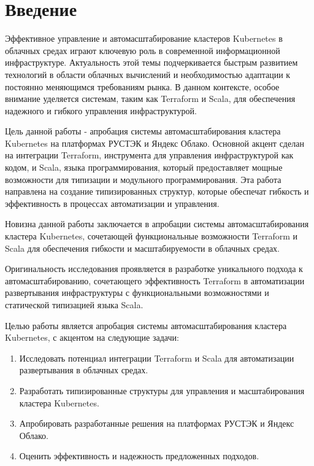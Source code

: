 \chapter*{Введение}
\label{sec:afterwords}

Эффективное управление и автомасштабирование кластеров Kubernetes в облачных
средах играют ключевую роль в современной информационной инфраструктуре.
Актуальность этой темы подчеркивается быстрым развитием технологий в области
облачных вычислений и необходимостью адаптации к постоянно меняющимся
требованиям рынка. В данном контексте, особое внимание уделяется системам, таким
как Terraform и Scala, для обеспечения надежного и гибкого управления
инфраструктурой.

Цель данной работы - апробация системы автомасштабирования кластера Kubernetes
на платформах РУСТЭК и Яндекс Облако. Основной акцент сделан на интеграции
Terraform, инструмента для управления инфраструктурой как кодом, и Scala, языка
программирования, который предоставляет мощные возможности для типизации и
модульного программирования. Эта работа направлена на создание типизированных
структур, которые обеспечат гибкость и эффективность в процессах автоматизации и
управления.


Новизна данной работы заключается в апробации системы автомасштабирования
кластера Kubernetes, сочетающей функциональные возможности Terraform и Scala для
обеспечения гибкости и масштабируемости в облачных средах.

Оригинальность исследования проявляется в разработке уникального подхода к
автомасштабированию, сочетающего эффективность Terraform в автоматизации
развертывания инфраструктуры с функциональными возможностями и статической
типизацией языка Scala.

Целью работы является апробация системы автомасштабирования кластера Kubernetes,
с акцентом на следующие задачи:

\begin{enumerate}
        \item Исследовать потенциал интеграции Terraform и Scala для
автоматизации развертывания в облачных средах.
        \item Разработать типизированные структуры для управления и
масштабирования кластера Kubernetes.
	\item Апробировать разработанные решения на платформах РУСТЭК и Яндекс Облако.
	\item Оценить эффективность и надежность предложенных подходов.
\end{enumerate}


